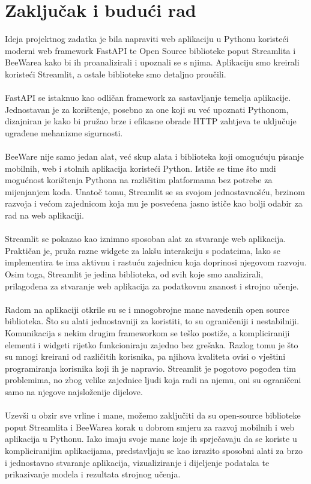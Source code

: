 \chapter{Zaključak i budući rad}

		Ideja projektnog zadatka je bila napraviti web aplikaciju u Pythonu koristeći moderni web framework FastAPI te Open Source biblioteke poput Streamlita i BeeWarea kako bi ih proanalizirali i upoznali se s njima. Aplikaciju smo kreirali koristeći Streamlit, a ostale biblioteke smo detaljno proučili.
		\\ \\
		FastAPI se istaknuo kao odličan framework za sastavljanje temelja aplikacije. Jednostavan je za korištenje, posebno za one koji su već upoznati Pythonom, dizajniran je kako bi pružao brze i efikasne obrade HTTP zahtjeva te uključuje ugrađene mehanizme sigurnosti.
		\\ \\
		BeeWare nije samo jedan alat, već skup alata i biblioteka koji omogućuju pisanje mobilnih, web i stolnih aplikacija koristeći Python. Ističe se time što nudi mogućnost korištenja Pythona na različitim platformama bez potrebe za mijenjanjem koda. Unatoč tomu, Streamlit se sa svojom jednostavnošću, brzinom razvoja i većom zajednicom koja mu je posvećena jasno ističe kao bolji odabir za rad na web aplikaciji.
		\\ \\
		Streamlit se pokazao kao iznimno sposoban alat za stvaranje web aplikacija. Praktičan je, pruža razne widgete za lakšu interakciju s podatcima, lako se implementira te ima aktivnu i rastuću zajednicu koja doprinosi njegovom razvoju. Osim toga, Streamlit je jedina biblioteka, od svih koje smo analizirali, prilagođena za stvaranje web aplikacija za podatkovnu znanost i strojno učenje.
		\\ \\
		Radom na aplikaciji otkrile su se i mnogobrojne mane navedenih open source biblioteka. Što su alati jednostavniji za koristiti, to su ograničeniji i nestabilniji. Komunikacija s nekim drugim frameworkom se teško postiže, a kompliciraniji elementi i widgeti rijetko funkcioniraju zajedno bez grešaka. Razlog tomu je što su mnogi kreirani od različitih korisnika, pa njihova kvaliteta ovisi o vještini programiranja korisnika koji ih je napravio. Streamlit je pogotovo pogođen tim problemima, no zbog velike zajednice ljudi koja radi na njemu, oni su ograničeni samo na njegove najsloženije dijelove.
		\\ \\
		Uzevši u obzir sve vrline i mane, možemo zaključiti da su open-source biblioteke poput Streamlita i BeeWarea korak u dobrom smjeru za razvoj mobilnih i web aplikacija u Pythonu. Iako imaju svoje mane koje ih sprječavaju da se koriste u kompliciranijim aplikacijama, predstavljaju se kao izrazito sposobni alati za brzo i jednostavno stvaranje aplikacija, vizualiziranje i dijeljenje podataka te prikazivanje modela i rezultata strojnog učenja.

		 \eject

